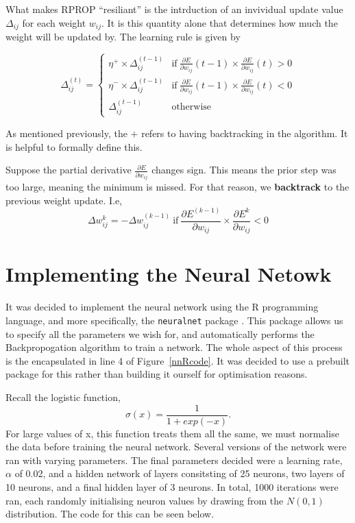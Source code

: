 What makes RPROP ``resiliant'' is the intrduction of an invividual update value $\Delta_{ij}$ for each weight $w_{ij}$. It is this quantity alone that determines 
how much the weight will be updated by. The learning rule is given by 

\begin{equation}
    \Delta_{ij}^{(t)} = 
    \begin{cases}
        \eta^{+}\times \Delta_{ij}^{(t-1)} & \text{if} \  \frac{\partial E}{\partial w_{ij}}(t-1)\times\frac{\partial E}{\partial w_{ij}}(t) > 0 \\
        \eta^{-}\times \Delta_{ij}^{(t-1)} & \text{if} \  \frac{\partial E}{\partial w_{ij}}(t-1)\times\frac{\partial E}{\partial w_{ij}}(t) < 0 \\
        \Delta_{ij}^{(t-1)} & \text{otherwise}
    \end{cases}
\end{equation}

As mentioned previously, the $+$ refers to having backtracking in the algorithm. It is helpful to formally define this.

\begin{definition}
    Suppose the partial derivative $\frac{\partial E}{\partial w_{ij}}$ changes sign. This means the prior step was too large, meaning the minimum is missed. For that reason, 
    we \textbf{backtrack} to the previous weight update. I.e,
    \[
        \Delta w_{ij}^k = -\Delta w_{ij}^{(k-1)} \  \text{if} \  \frac{\partial E^{(k-1)}}{\partial w_{ij}} \times \frac{\partial E^k}{\partial w_{ij}} < 0 
    \]
\end{definition}

\section{Implementing the Neural Netowk}
It was decided to implement the neural network using the R programming language, and more specifically, the \verb|neuralnet| package \cite{gunther}. This package 
allows us to specify all the parameters we wish for, and automatically performs the Backpropogation algorithm to train a network. The whole aspect of this process is the encapsulated in line 4
of Figure~\ref{nnRcode}. It was decided to use a prebuilt package for this rather than building it ourself for optimisation reasons. 

Recall the logistic function, $$\sigma(x) = \frac{1}{1+exp(-x)}.$$ For large values of x, this function treats them all the same, we must normalise the data before training the neural 
network. Several versions of the network were ran with varying parameters. The final parameters decided were a learning rate, $\alpha$ of 0.02, and a hidden network of layers consitsting of 
25 neurons, two layers of 10 neurons, and a final hidden layer of 3 neurons. In total, 1000 iterations were ran, each randomly initialising neuron values by drawing from the $N(0,1)$ distribution. 
The code for this can be seen below.

